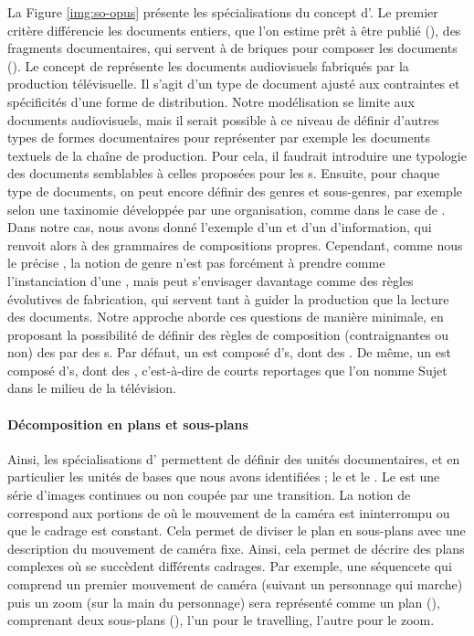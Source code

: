 La Figure \ref{img:so-opus} présente les spécialisations du concept d'.
Le premier critère différencie les documents entiers, que l'on estime prêt à être publié (), des fragments documentaires, qui servent à de briques pour composer les documents ().
Le concept de  représente les documents audiovisuels fabriqués par la production télévisuelle. 
Il s'agit d'un type de document ajusté aux contraintes et spécificités d'une forme de distribution. 
Notre modélisation se limite aux documents audiovisuels, mais il serait possible à ce niveau de définir d'autres types de formes documentaires pour représenter par exemple les documents textuels de la chaîne de production.
Pour cela, il faudrait introduire une typologie des documents semblables à celles proposées pour les s.
Ensuite, pour chaque type de documents, on peut encore définir des genres et sous-genres, par exemple selon une taxinomie développée par une organisation, comme dans le case de \cite[Annexe B]{Troncy2004}.
Dans notre cas, nous avons donné l'exemple d'un  et d'un  d'information, qui renvoit alors à des grammaires de compositions propres. 
Cependant, comme nous le précise \cite[\S3.6]{Gaillard2008}, la notion de genre n'est pas forcément à prendre comme l'instanciation d'une , mais peut s'envisager davantage comme des règles évolutives de fabrication, qui servent tant à guider la production que la lecture des documents.
Notre approche aborde ces questions de manière minimale, en proposant la possibilité de définir des règles de composition (contraignantes ou non) des  par des s.
Par défaut, un  est composé d's, dont des . 
De même, un  est composé d's, dont des , c'est-à-dire de courts reportages que l'on nomme Sujet dans le milieu de la télévision. 

\paragraph{Décomposition en plans et sous-plans}
Ainsi, les spécialisations d' permettent de définir des unités documentaires, et en particulier les unités de bases que nous avons identifiées ; le  et le .
Le  est une série d'images continues ou non coupée par une transition.
La notion de  correspond aux portions de  où le mouvement de la caméra est ininterrompu ou que le cadrage est constant.
Cela permet de diviser le plan en sous-plans avec une description du mouvement de caméra fixe.
Ainsi, cela permet de décrire des plans complexes où se succèdent différents cadrages. 
Par exemple, une séquencete qui comprend un premier mouvement de caméra (suivant un personnage qui marche) puis un zoom (sur la main du personnage) sera représenté comme un plan (), comprenant deux sous-plans (), l'un pour le travelling, l'autre pour le zoom. 

